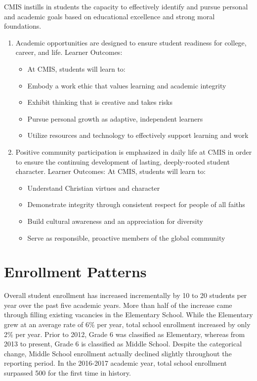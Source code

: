 \documentclass{report}
\begin{document}
CMIS instills in students the capacity to effectively identify and pursue personal and academic goals based on educational excellence and strong moral foundations.
\begin{enumerate}
\item Academic opportunities are designed to ensure student readiness for college, career, and life.
Learner Outcomes:
\begin{itemize}  
\item At CMIS, students will learn to:
\item Embody a work ethic that values learning and academic integrity
\item Exhibit thinking that is creative and takes risks 
\item Pursue personal growth as adaptive, independent learners
\item Utilize resources and technology to effectively support learning and work
\end{itemize}
\item Positive community participation is emphasized in daily life at CMIS in order to ensure the continuing development of lasting, deeply-rooted student character.
Learner Outcomes:
At CMIS, students will learn to:
\begin{itemize}
\item Understand Christian virtues and character
\item Demonstrate integrity through consistent respect for people of all faiths
\item Build cultural awareness and an appreciation for diversity
\item Serve as responsible, proactive members of the global community
\end{itemize}
\end{enumerate}

\section{Enrollment Patterns}

Overall student enrollment has increased incrementally by 10 to 20 students per year over the past five academic years.  More than half of the increase came through filling existing vacancies in the Elementary School.  While the Elementary grew at an average rate of 6\% per year, total school enrollment increased by only 2\% per year.  Prior to 2012, Grade 6 was classified as Elementary, whereas from 2013 to present, Grade 6 is classified as Middle School.  Despite the categorical change, Middle School enrollment actually declined slightly throughout the reporting period.  In the 2016-2017 academic year, total school enrollment surpassed 500 for the first time in history.
\end{document}
